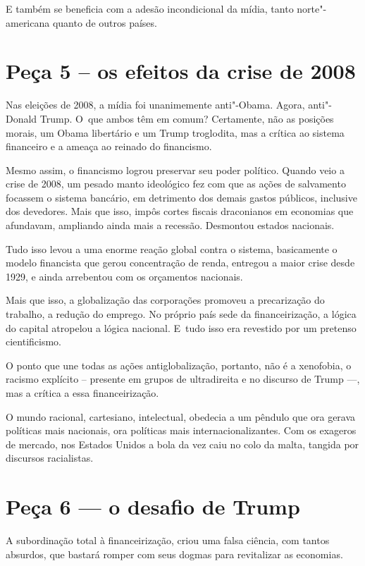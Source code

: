 E também se beneficia com a adesão incondicional da mídia, tanto
norte"-americana quanto de outros países.

\section{Peça 5 -- os efeitos da crise de 2008}

Nas eleições de 2008, a mídia foi unanimemente anti"-Obama. Agora,
anti"-Donald Trump. O~que ambos têm em comum? Certamente, não as posições
morais, um Obama libertário e um Trump troglodita, mas a crítica ao
sistema financeiro e a ameaça ao reinado do financismo.

Mesmo assim, o financismo logrou preservar seu poder político. Quando
veio a crise de 2008, um pesado manto ideológico fez com que as ações de
salvamento focassem o sistema bancário, em detrimento dos demais gastos
públicos, inclusive dos devedores. Mais que isso, impôs cortes fiscais
draconianos em economias que afundavam, ampliando ainda mais a recessão.
Desmontou estados nacionais.

Tudo isso levou a uma enorme reação global contra o sistema, basicamente
o modelo financista que gerou concentração de renda, entregou a maior
crise desde 1929, e ainda arrebentou com os orçamentos nacionais.

Mais que isso, a globalização das corporações promoveu a precarização do
trabalho, a redução do emprego. No próprio país sede da financeirização,
a lógica do capital atropelou a lógica nacional. E~tudo isso era
revestido por um pretenso cientificismo.

O ponto que une todas as ações antiglobalização, portanto, não é a
xenofobia, o racismo explícito -- presente em grupos de ultradireita e
no discurso de Trump \mbox{---,} mas a crítica a essa financeirização.

O mundo racional, cartesiano, intelectual, obedecia a um pêndulo que ora
gerava políticas mais nacionais, ora políticas mais
internacionalizantes. Com os exageros de mercado, nos Estados Unidos a
bola da vez caiu no colo da malta, tangida por discursos racialistas.

\section{Peça 6 --- o desafio de Trump}

A subordinação total à financeirização, criou uma falsa ciência, com
tantos absurdos, que bastará romper com seus dogmas para revitalizar as
economias.

